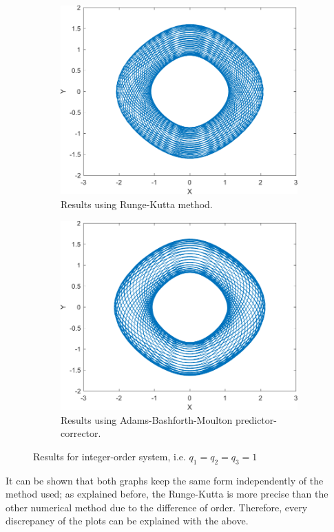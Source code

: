 \begin{figure}[H]
  \centering
  \begin{subfigure}[H]{0.4\textwidth}
    \includegraphics[scale = 0.5]{files/IntegerKutta2.pdf}
    \centering
    \caption{Results using Runge-Kutta method.}
  \end{subfigure}
  \hspace{1cm}
  \begin{subfigure}[H]{0.4\textwidth}
    \includegraphics[scale = 0.5]{files/IntegerAdam2.pdf}
    \centering
    \caption{Results using Adams-Bashforth-Moulton predictor-corrector.}
    \label{}
  \end{subfigure}
  \caption{Results for integer-order system, i.e. $q_1=q_2=q_3=1$}
  \label{fig:7}
\end{figure}

It can be shown that both graphs keep the same form independently of the method used; as explained before, the Runge-Kutta is more precise than the other numerical method due to the difference of order. Therefore, every discrepancy of the plots can be explained with the above. 
